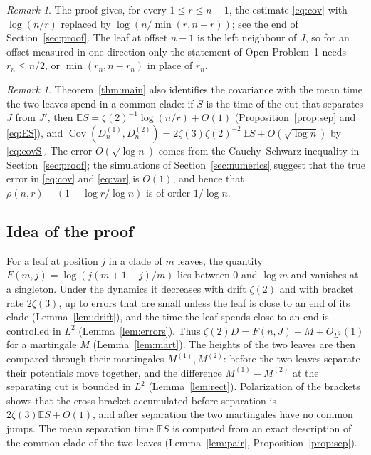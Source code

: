 \documentclass[11pt]{amsart}
\theoremstyle{remark}
\newtheorem{remark}[theorem]{Remark}
\numberwithin{equation}{section}
\newcommand{\E}{\mathbb E}
\newcommand{\Cov}{\operatorname{Cov}}
\begin{document}
\begin{remark}\label{rem:oriented}
The proof gives, for every $1\le r\le n-1$, the estimate \eqref{eq:cov} with $\log(n/r)$ replaced by $\log(n/\min(r,n-r))$; see the end of Section~\ref{sec:proof}. The leaf at offset $n-1$ is the left neighbour of $J$, so for an offset measured in one direction only the statement of Open Problem~1 needs $r_n\le n/2$, or $\min(r_n,n-r_n)$ in place of $r_n$.
\end{remark}

\begin{remark}
Theorem~\ref{thm:main} also identifies the covariance with the mean time the two leaves spend in a common clade: if $S$ is the time of the cut that separates $J$ from $J'$, then $\E S=\zeta(2)^{-1}\log(n/r)+O(1)$ (Proposition~\ref{prop:sep} and \eqref{eq:ES}), and $\Cov(D^{(1)}_n,D^{(2)}_n)=2\zeta(3)\zeta(2)^{-2}\,\E S+O(\sqrt{\log n})$ by \eqref{eq:covS}. The error $O(\sqrt{\log n})$ comes from the Cauchy--Schwarz inequality in Section~\ref{sec:proof}; the simulations of Section~\ref{sec:numerics} suggest that the true error in \eqref{eq:cov} and \eqref{eq:var} is $O(1)$, and hence that $\rho(n,r)-(1-\log r/\log n)$ is of order $1/\log n$.
\end{remark}

\subsection*{Idea of the proof}
For a leaf at position $j$ in a clade of $m$ leaves, the quantity $F(m,j)=\log(j(m+1-j)/m)$ lies between $0$ and $\log m$ and vanishes at a singleton. Under the dynamics it decreases with drift $\zeta(2)$ and with bracket rate $2\zeta(3)$, up to errors that are small unless the leaf is close to an end of its clade (Lemma~\ref{lem:drift}), and the time the leaf spends close to an end is controlled in $L^2$ (Lemma~\ref{lem:errors}). Thus $\zeta(2)D=F(n,J)+M+O_{L^2}(1)$ for a martingale $M$ (Lemma~\ref{lem:mart}). The heights of the two leaves are then compared through their martingales $M^{(1)},M^{(2)}$: before the two leaves separate their potentials move together, and the difference $M^{(1)}-M^{(2)}$ at the separating cut is bounded in $L^2$ (Lemma~\ref{lem:rect}). Polarization of the brackets shows that the cross bracket accumulated before separation is $2\zeta(3)\E S+O(1)$, and after separation the two martingales have no common jumps. The mean separation time $\E S$ is computed from an exact description of the common clade of the two leaves (Lemma~\ref{lem:pair}, Proposition~\ref{prop:sep}).
\end{document}
